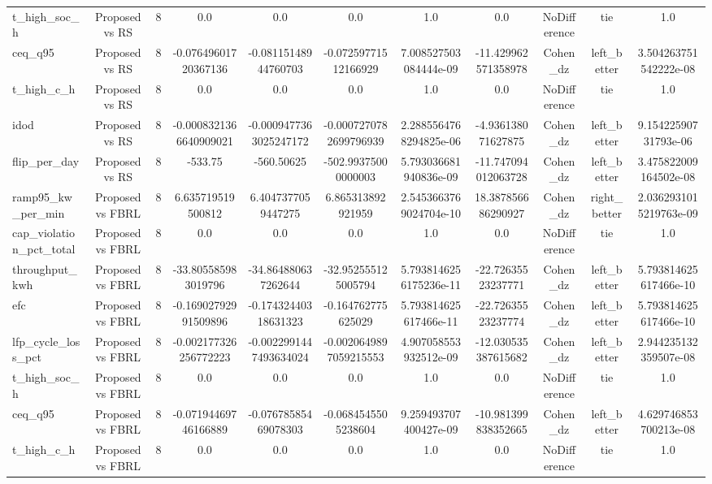 \begin{table}[t]
\begin{tabular}{lcccccccccc}
t\_high\_soc\_h & Proposed vs RS & 8 & 0.0 & 0.0 & 0.0 & 1.0 & 0.0 & NoDifference & tie & 1.0 \\
ceq\_q95 & Proposed vs RS & 8 & -0.07649601720367136 & -0.08115148944760703 & -0.07259771512166929 & 7.008527503084444e-09 & -11.429962571358978 & Cohen\_dz & left\_better & 3.504263751542222e-08 \\
t\_high\_c\_h & Proposed vs RS & 8 & 0.0 & 0.0 & 0.0 & 1.0 & 0.0 & NoDifference & tie & 1.0 \\
idod & Proposed vs RS & 8 & -0.0008321366640909021 & -0.0009477363025247172 & -0.0007270782699796939 & 2.2885564768294825e-06 & -4.936138071627875 & Cohen\_dz & left\_better & 9.15422590731793e-06 \\
flip\_per\_day & Proposed vs RS & 8 & -533.75 & -560.50625 & -502.99375000000003 & 5.793036681940836e-09 & -11.747094012063728 & Cohen\_dz & left\_better & 3.475822009164502e-08 \\
ramp95\_kw\_per\_min & Proposed vs FBRL & 8 & 6.635719519500812 & 6.4047377059447275 & 6.865313892921959 & 2.5453663769024704e-10 & 18.387856686290927 & Cohen\_dz & right\_better & 2.0362931015219763e-09 \\
cap\_violation\_pct\_total & Proposed vs FBRL & 8 & 0.0 & 0.0 & 0.0 & 1.0 & 0.0 & NoDifference & tie & 1.0 \\
throughput\_kwh & Proposed vs FBRL & 8 & -33.805585983019796 & -34.864880637262644 & -32.952555125005794 & 5.7938146256175236e-11 & -22.72635523237771 & Cohen\_dz & left\_better & 5.793814625617466e-10 \\
efc & Proposed vs FBRL & 8 & -0.16902792991509896 & -0.17432440318631323 & -0.164762775625029 & 5.793814625617466e-11 & -22.72635523237774 & Cohen\_dz & left\_better & 5.793814625617466e-10 \\
lfp\_cycle\_loss\_pct & Proposed vs FBRL & 8 & -0.002177326256772223 & -0.0022991447493634024 & -0.0020649897059215553 & 4.907058553932512e-09 & -12.030535387615682 & Cohen\_dz & left\_better & 2.944235132359507e-08 \\
t\_high\_soc\_h & Proposed vs FBRL & 8 & 0.0 & 0.0 & 0.0 & 1.0 & 0.0 & NoDifference & tie & 1.0 \\
ceq\_q95 & Proposed vs FBRL & 8 & -0.07194469746166889 & -0.07678585469078303 & -0.0684545505238604 & 9.259493707400427e-09 & -10.981399838352665 & Cohen\_dz & left\_better & 4.629746853700213e-08 \\
t\_high\_c\_h & Proposed vs FBRL & 8 & 0.0 & 0.0 & 0.0 & 1.0 & 0.0 & NoDifference & tie & 1.0 \\

\end{tabular}
\end{table}
